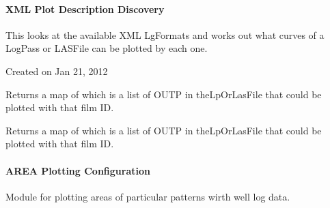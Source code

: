 \documentclass[letterpaper,10pt,english]{sphinxmanual}
\begin{document}
\paragraph{XML Plot Description Discovery}
\label{\detokenize{ref/util/plot/XMLMatches:xml-plot-description-discovery}}\label{\detokenize{ref/util/plot/XMLMatches::doc}}\label{\detokenize{ref/util/plot/XMLMatches:module-TotalDepth.util.plot.XMLMatches}}
This looks at the available XML LgFormats and works out what curves of a LogPass
or LASFile can be plotted by each one.

Created on Jan 21, 2012

\begin{fulllineitems}
\label{\detokenize{ref/util/plot/XMLMatches:TotalDepth.util.plot.XMLMatches.fileCurveMap}}
Returns a map of  which is a list of OUTP in theLpOrLasFile
that could be plotted with that film ID.

\end{fulllineitems}


\begin{fulllineitems}
\label{\detokenize{ref/util/plot/XMLMatches:TotalDepth.util.plot.XMLMatches.fileCurveMapFromFILM}}
Returns a map of  which is a list of OUTP in theLpOrLasFile
that could be plotted with that film ID.

\end{fulllineitems}



\paragraph{AREA Plotting Configuration}
\label{\detokenize{ref/util/plot/AREACfg:area-plotting-configuration}}\label{\detokenize{ref/util/plot/AREACfg::doc}}\label{\detokenize{ref/util/plot/AREACfg:module-TotalDepth.util.plot.AREACfg}}
Module for plotting areas of particular patterns wirth well log data.
\end{document}

